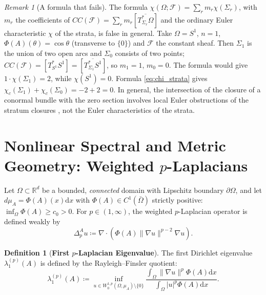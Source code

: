 \documentclass[11pt,a4paper,reqno]{amsart}
\theoremstyle{definition}
\newtheorem{definition}[theorem]{Definition}
\theoremstyle{remark}
\newtheorem{remark}[theorem]{Remark}
\numberwithin{equation}{section}
\newcommand{\dif}{\mathrm{d}}
\begin{document}
\begin{remark}[A formula that fails]
\label{rem:chi_counterexample}
The formula $\chi(\Omega; \mathcal{F}) = \sum_r m_r \chi(\Sigma_r)$, with $m_r$ the coefficients of $CC(\mathcal{F}) = \sum_r m_r [\overline{T^*_{\Sigma_r}\Omega}]$ and the ordinary Euler characteristic $\chi$ of the strata, is false in general. Take $\Omega = S^1$, $n = 1$, $\Phi(A)(\theta) = \cos\theta$ (transverse to $\{0\}$) and $\mathcal{F}$ the constant sheaf. Then $\Sigma_1$ is the union of two open arcs and $\Sigma_0$ consists of two points; $CC(\mathcal{F}) = [T^*_{S^1}S^1] = [\overline{T^*_{\Sigma_1} S^1}]$, so $m_1 = 1$, $m_0 = 0$. The formula would give $1\cdot\chi(\Sigma_1) = 2$, while $\chi(S^1) = 0$. Formula \eqref{eq:chi_strata} gives $\chi_c(\Sigma_1) + \chi_c(\Sigma_0) = -2 + 2 = 0$. In general, the intersection of the closure of a conormal bundle with the zero section involves local Euler obstructions of the stratum closures \cite{MacPherson1974}, not the Euler characteristics of the strata.
\end{remark}

\section{Nonlinear Spectral and Metric Geometry: Weighted \texorpdfstring{$p$}{p}-Laplacians}
\label{sec:nonlinear}

Let $\Omega \subset \mathbb{R}^d$ be a bounded, \emph{connected} domain with Lipschitz boundary $\partial\Omega$, and let $d\mu_A = \Phi(A)(x) \dif x$ with $\Phi(A) \in C^1(\bar{\Omega})$ strictly positive: $\inf_\Omega \Phi(A) \ge c_0 > 0$. For $p \in (1, \infty)$, the weighted $p$-Laplacian operator is defined weakly by
\begin{equation}
\Delta_p^A u \coloneqq \nabla \cdot \left( \Phi(A) \|\nabla u\|^{p-2} \nabla u \right).
\end{equation}

\begin{definition}[\textbf{First $p$-Laplacian Eigenvalue}]
\label{def:p_laplacian}
The first Dirichlet eigenvalue $\lambda_1^{(p)}(A)$ is defined by the Rayleigh--Finsler quotient:
\begin{equation}
\label{eq:rayleigh_p}
\lambda_1^{(p)}(A) \coloneqq \inf_{u \in W_0^{1,p}(\Omega, \mu_A) \setminus \{0\}} \frac{\int_\Omega \|\nabla u\|^p \Phi(A) \dif x}{\int_\Omega |u|^p \Phi(A) \dif x}.
\end{equation}
\end{definition}
\end{document}
